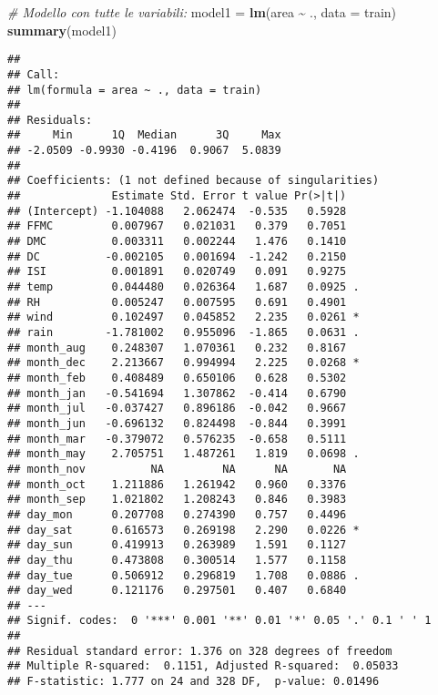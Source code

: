 \documentclass[
]{article}
\newenvironment{Shaded}{\begin{snugshade}}{\end{snugshade}}
\newcommand{\AttributeTok}[1]{\textcolor[rgb]{0.13,0.29,0.53}{#1}}
\newcommand{\CommentTok}[1]{\textcolor[rgb]{0.56,0.35,0.01}{\textit{#1}}}
\newcommand{\FunctionTok}[1]{\textcolor[rgb]{0.13,0.29,0.53}{\textbf{#1}}}
\newcommand{\NormalTok}[1]{#1}
\newcommand{\OtherTok}[1]{\textcolor[rgb]{0.56,0.35,0.01}{#1}}
\newcommand{\SpecialCharTok}[1]{\textcolor[rgb]{0.81,0.36,0.00}{\textbf{#1}}}
\begin{document}
\begin{Shaded}
\begin{Highlighting}[]
\CommentTok{\# Modello con tutte le variabili:}
\NormalTok{model1 }\OtherTok{=} \FunctionTok{lm}\NormalTok{(area }\SpecialCharTok{\textasciitilde{}}\NormalTok{ ., }\AttributeTok{data =}\NormalTok{ train)}
\FunctionTok{summary}\NormalTok{(model1)}
\end{Highlighting}
\end{Shaded}

\begin{verbatim}
## 
## Call:
## lm(formula = area ~ ., data = train)
## 
## Residuals:
##     Min      1Q  Median      3Q     Max 
## -2.0509 -0.9930 -0.4196  0.9067  5.0839 
## 
## Coefficients: (1 not defined because of singularities)
##              Estimate Std. Error t value Pr(>|t|)  
## (Intercept) -1.104088   2.062474  -0.535   0.5928  
## FFMC         0.007967   0.021031   0.379   0.7051  
## DMC          0.003311   0.002244   1.476   0.1410  
## DC          -0.002105   0.001694  -1.242   0.2150  
## ISI          0.001891   0.020749   0.091   0.9275  
## temp         0.044480   0.026364   1.687   0.0925 .
## RH           0.005247   0.007595   0.691   0.4901  
## wind         0.102497   0.045852   2.235   0.0261 *
## rain        -1.781002   0.955096  -1.865   0.0631 .
## month_aug    0.248307   1.070361   0.232   0.8167  
## month_dec    2.213667   0.994994   2.225   0.0268 *
## month_feb    0.408489   0.650106   0.628   0.5302  
## month_jan   -0.541694   1.307862  -0.414   0.6790  
## month_jul   -0.037427   0.896186  -0.042   0.9667  
## month_jun   -0.696132   0.824498  -0.844   0.3991  
## month_mar   -0.379072   0.576235  -0.658   0.5111  
## month_may    2.705751   1.487261   1.819   0.0698 .
## month_nov          NA         NA      NA       NA  
## month_oct    1.211886   1.261942   0.960   0.3376  
## month_sep    1.021802   1.208243   0.846   0.3983  
## day_mon      0.207708   0.274390   0.757   0.4496  
## day_sat      0.616573   0.269198   2.290   0.0226 *
## day_sun      0.419913   0.263989   1.591   0.1127  
## day_thu      0.473808   0.300514   1.577   0.1158  
## day_tue      0.506912   0.296819   1.708   0.0886 .
## day_wed      0.121176   0.297501   0.407   0.6840  
## ---
## Signif. codes:  0 '***' 0.001 '**' 0.01 '*' 0.05 '.' 0.1 ' ' 1
## 
## Residual standard error: 1.376 on 328 degrees of freedom
## Multiple R-squared:  0.1151, Adjusted R-squared:  0.05033 
## F-statistic: 1.777 on 24 and 328 DF,  p-value: 0.01496
\end{verbatim}
\end{document}
